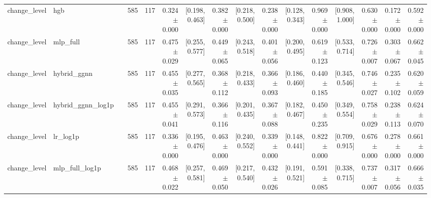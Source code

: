 \begin{table}[htbp]
{\begin{tabular}{llrrrrrrrrrrrrrr}
change\_level & hgb &  & 585 & 117 & 0.324 $\pm$ 0.000 & [0.198, 0.463] & 0.382 $\pm$ 0.000 & [0.218, 0.500] & 0.238 $\pm$ 0.000 & [0.128, 0.343] & 0.969 $\pm$ 0.000 & [0.908, 1.000] & 0.630 $\pm$ 0.000 & 0.172 $\pm$ 0.000 & 0.592 $\pm$ 0.000 \\
change\_level & mlp\_full &  & 585 & 117 & 0.475 $\pm$ 0.029 & [0.255, 0.577] & 0.449 $\pm$ 0.065 & [0.243, 0.518] & 0.401 $\pm$ 0.056 & [0.200, 0.495] & 0.619 $\pm$ 0.123 & [0.533, 0.714] & 0.726 $\pm$ 0.007 & 0.303 $\pm$ 0.067 & 0.662 $\pm$ 0.045 \\
change\_level & hybrid\_ggnn &  & 585 & 117 & 0.455 $\pm$ 0.035 & [0.277, 0.565] & 0.368 $\pm$ 0.112 & [0.218, 0.433] & 0.366 $\pm$ 0.093 & [0.186, 0.460] & 0.440 $\pm$ 0.185 & [0.345, 0.546] & 0.746 $\pm$ 0.027 & 0.235 $\pm$ 0.102 & 0.620 $\pm$ 0.059 \\
change\_level & hybrid\_ggnn\_log1p &  & 585 & 117 & 0.455 $\pm$ 0.041 & [0.291, 0.573] & 0.366 $\pm$ 0.116 & [0.201, 0.435] & 0.367 $\pm$ 0.088 & [0.182, 0.467] & 0.450 $\pm$ 0.235 & [0.349, 0.554] & 0.758 $\pm$ 0.029 & 0.238 $\pm$ 0.113 & 0.624 $\pm$ 0.070 \\
change\_level & lr\_log1p &  & 585 & 117 & 0.336 $\pm$ 0.000 & [0.195, 0.476] & 0.463 $\pm$ 0.000 & [0.240, 0.552] & 0.339 $\pm$ 0.000 & [0.148, 0.441] & 0.822 $\pm$ 0.000 & [0.709, 0.915] & 0.676 $\pm$ 0.000 & 0.278 $\pm$ 0.000 & 0.661 $\pm$ 0.000 \\
change\_level & mlp\_full\_log1p &  & 585 & 117 & 0.468 $\pm$ 0.022 & [0.257, 0.581] & 0.469 $\pm$ 0.050 & [0.217, 0.540] & 0.432 $\pm$ 0.026 & [0.191, 0.521] & 0.591 $\pm$ 0.085 & [0.338, 0.715] & 0.737 $\pm$ 0.007 & 0.317 $\pm$ 0.056 & 0.666 $\pm$ 0.035 \\
\bottomrule
\end{tabular}}
\end{table}
